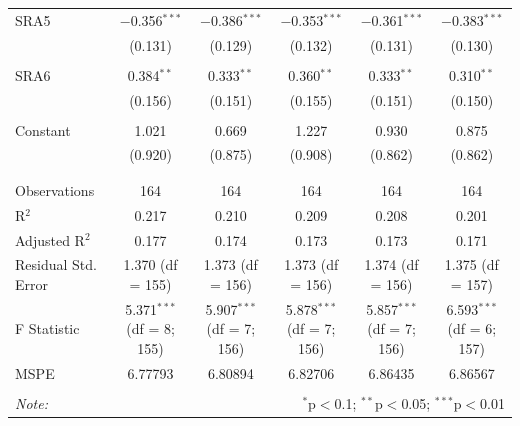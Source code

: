\documentclass[12pt]{article}
\begin{document}
\begin{table}[!htbp]
\begin{adjustbox}{width=\textwidth}
\begin{tabular}{@{\extracolsep{5pt}}lccccc}
 SRA5 & $-$0.356$^{***}$ & $-$0.386$^{***}$ & $-$0.353$^{***}$ & $-$0.361$^{***}$ & $-$0.383$^{***}$ \\ 
  & (0.131) & (0.129) & (0.132) & (0.131) & (0.130) \\ 
  & & & & & \\ 
 SRA6 & 0.384$^{**}$ & 0.333$^{**}$ & 0.360$^{**}$ & 0.333$^{**}$ & 0.310$^{**}$ \\ 
  & (0.156) & (0.151) & (0.155) & (0.151) & (0.150) \\ 
  & & & & & \\ 
 Constant & 1.021 & 0.669 & 1.227 & 0.930 & 0.875 \\ 
  & (0.920) & (0.875) & (0.908) & (0.862) & (0.862) \\ 
  & & & & & \\ 
\hline \\[-1.8ex] 
Observations & 164 & 164 & 164 & 164 & 164 \\ 
R$^{2}$ & 0.217 & 0.210 & 0.209 & 0.208 & 0.201 \\ 
Adjusted R$^{2}$ & 0.177 & 0.174 & 0.173 & 0.173 & 0.171 \\ 
Residual Std. Error & 1.370 (df = 155) & 1.373 (df = 156) & 1.373 (df = 156) & 1.374 (df = 156) & 1.375 (df = 157) \\ 
F Statistic & 5.371$^{***}$ (df = 8; 155) & 5.907$^{***}$ (df = 7; 156) & 5.878$^{***}$ (df = 7; 156) & 5.857$^{***}$ (df = 7; 156) & 6.593$^{***}$ (df = 6; 157) \\
MSPE & 6.77793 & 6.80894 & 6.82706 & 6.86435 & 6.86567 \\
\hline 
\hline \\[-1.8ex] 
\textit{Note:}  & \multicolumn{5}{r}{$^{*}$p$<$0.1; $^{**}$p$<$0.05; $^{***}$p$<$0.01} \\ 
\end{tabular} 
\end{adjustbox}
\end{table} 
\end{document}
